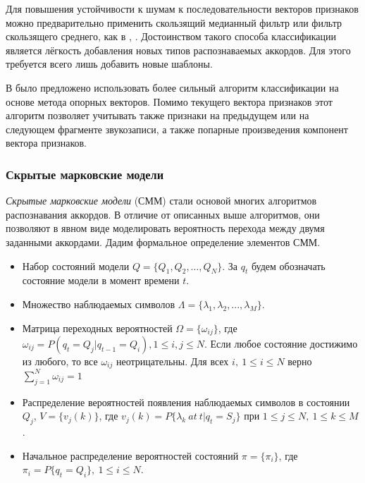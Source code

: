 Для повышения устойчивости к шумам к последовательности векторов признаков
можно предварительно применить скользящий медианный фильтр или фильтр
скользящего среднего, как в \cite{Lee2006}, \cite{Oudre2009}. Достоинством
такого способа классификации является лёгкость добавления новых типов
распознаваемых аккордов. Для этого требуется всего лишь добавить новые шаблоны.

В \cite{Weller2009} было предложено использовать более сильный алгоритм
классификации на основе метода опорных векторов. Помимо текущего вектора
признаков этот алгоритм позволяет учитывать также признаки на предыдущем или на
следующем фрагменте звукозаписи, а также попарные произведения компонент вектора
признаков.

\subsubsection{Скрытые марковские модели}

\emph{Скрытые марковские модели} (СММ) \cite{Rabiner1989} стали основой многих
алгоритмов распознавания аккордов. В отличие от описанных выше алгоритмов, они
позволяют в явном виде моделировать вероятность перехода между двумя заданными
аккордами. Дадим формальное определение элементов СММ.

\begin{itemize}

\item Набор состояний модели $Q = \{Q_1, Q_2, \ldots , Q_N\}$. За
$q_t$ будем обозначать состояние модели в момент времени $t$.

\item Множество наблюдаемых символов $\Lambda = \{\lambda_1, \lambda_2, ...,
\lambda_M\}$.

\item Матрица переходных вероятностей $\Omega = \{\omega_{ij}\}$, где
$\omega_{ij} = P(q_t = Q_j | q_{t-1} = Q_i), \! 1 \leq i,j \leq N$. Если любое
состояние достижимо из любого, то все $\omega_{ij}$ неотрицательны. Для всех
$i,~1 \leq i \leq N$ верно $\sum_{j=1}^N \omega_{ij} = 1$

\item Распределение вероятностей появления наблюдаемых символов в состоянии
$Q_j$, $V=\{v_j(k)\}$, где $v_j(k) = P\{\lambda_k \: at \: t|q_t = S_j\}$ при $1
\leq j \leq N, \: 1 \leq k \leq M$.

\item Начальное распределение вероятностей состояний $\pi =
\{\pi_i\}$, где $\pi_i = P\{q_t = Q_i\}, \: 1 \leq i \leq N$.

\end{itemize}

